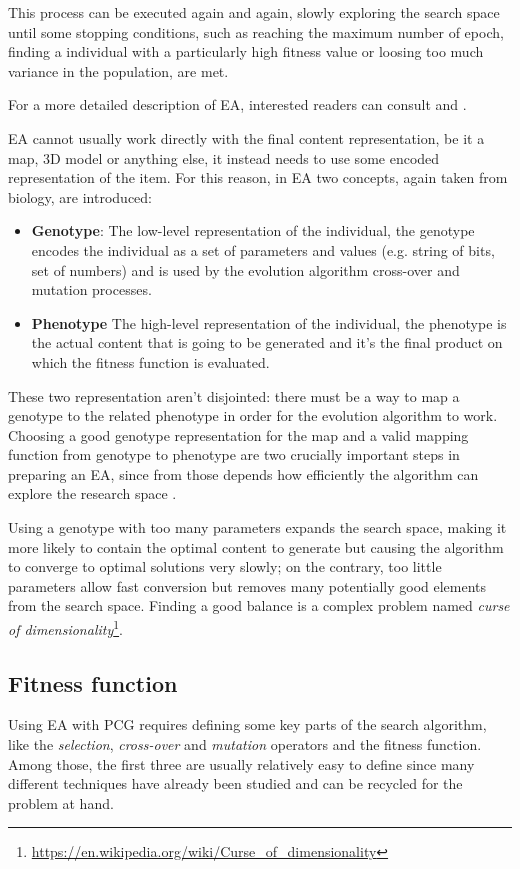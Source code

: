 This process can be executed again and again, slowly exploring the search space until some stopping conditions, such as reaching the maximum number of epoch, finding a individual with a particularly high fitness value or loosing too much variance in the population, are met.

For a more detailed description of EA, interested readers can consult \cite{essentials_of_metaheuristics} and \cite{ea_critical_review}.

EA cannot usually work directly with the final content representation, be it a map, 3D model or anything else, it instead needs to use some encoded representation of the item. For this reason, in EA two concepts, again taken from biology, are introduced:
\begin{itemize}
\item \textbf{Genotype}: The low-level representation of the individual, the genotype encodes the individual as a set of parameters and values (e.g. string of bits, set of numbers) and is used by the evolution algorithm cross-over and mutation processes.
\item \textbf{Phenotype} The high-level representation of the individual, the phenotype is the actual content that is going to be generated and it’s the final product on which the fitness function is evaluated.
\end{itemize}

These two representation aren’t disjointed: there must be a way to map a genotype to the related phenotype in order for the evolution algorithm to work. Choosing a good genotype representation for the map and a valid mapping function from genotype to phenotype are two crucially important steps in preparing an EA,
since from those depends how efficiently the algorithm can explore the research space \cite{sbpcg_taxonomy}.

Using a genotype with too many parameters expands the search space, making it more likely to contain the optimal content to generate but causing the algorithm to converge to optimal solutions very slowly; on the contrary, too little parameters allow fast conversion but removes many potentially good elements from the search space. Finding a good balance is a complex problem named \textit{curse of dimensionality}\footnote{\url{https://en.wikipedia.org/wiki/Curse_of_dimensionality}}.

\subsection{Fitness function}
\label{section:fitness_function}
Using EA with PCG requires defining some key parts of the search algorithm, like the \textit{selection}, \textit{cross-over} and \textit{mutation} operators and the fitness function. Among those, the first three are usually relatively easy to define since many different techniques have already been studied and can be recycled for the problem at hand.

